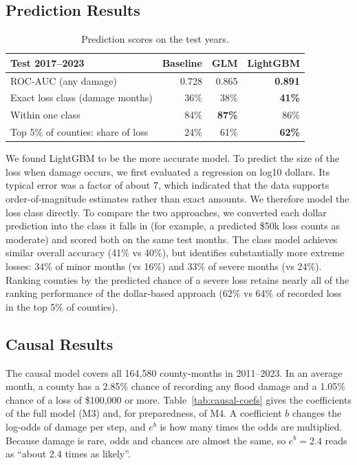 \documentclass[10pt,twocolumn]{article}
\begin{document}
\subsection{Prediction Results}

\begin{table}[H]
\centering
\small
\renewcommand{\arraystretch}{1.15}
\begin{tabularx}{\linewidth}{@{}Lrrr@{}}
\toprule
Test 2017--2023 & Baseline & GLM & LightGBM \\
\midrule
ROC-AUC (any damage)               & 0.728 & 0.865 & \textbf{0.891} \\
Exact loss class (damage months)   & 36\%  & 38\%  & \textbf{41\%} \\
Within one class                   & 84\%  & \textbf{87\%} & 86\% \\
Top 5\% of counties: share of loss & 24\%  & 61\%  & \textbf{62\%} \\
\bottomrule
\end{tabularx}
\caption{Prediction scores on the test years.}
\label{tab:pred-results}
\end{table}

We found LightGBM to be the more accurate model. To predict the size of the
loss when damage occurs, we first evaluated a regression on log10 dollars. Its typical error was a factor of about 7, which indicated that the data supports order-of-magnitude estimates rather than exact amounts. We therefore model the loss class directly. To compare the two approaches,
we converted each dollar prediction into the class it falls in (for example, a predicted \$50k
loss counts as moderate) and scored both on the same test months. The class model achieves similar
overall accuracy (41\% vs 40\%), but identifies substantially more extreme losses: 34\% of minor
months (vs 16\%) and 33\% of severe months (vs 24\%). Ranking counties by the predicted chance of
a severe loss retains nearly all of the ranking performance of the dollar-based approach (62\% vs
64\% of recorded loss in the top 5\% of counties).

\subsection{Causal Results}
\label{sec:adj-results}

The causal model covers all 164{,}580 county-months in 2011--2023. In an average month, a county
has a 2.85\% chance of recording any flood damage and a 1.05\% chance of a loss of \$100{,}000 or
more. Table~\ref{tab:causal-coefs} gives the coefficients of the full model (M3) and, for
preparedness, of M4. A coefficient $b$ changes the log-odds of damage per step, and $e^b$ is how
many times the odds are multiplied. Because damage is rare, odds and chances are almost the same,
so $e^b = 2.4$ reads as ``about 2.4 times as likely''.
\end{document}
